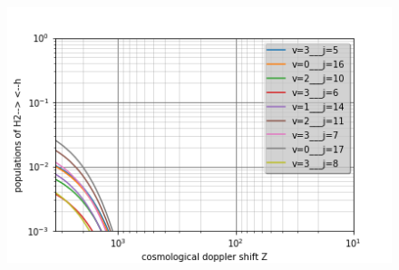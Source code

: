 \documentclass[10pt, a4paper]{report}
\numberwithin{equation}{subsection}
\begin{document}
\begin{figure}[]
\centering
\includegraphics[width=14.0cm,height=9cm]{levelsh2-h.5.png}
\end{figure}

\end{document}
